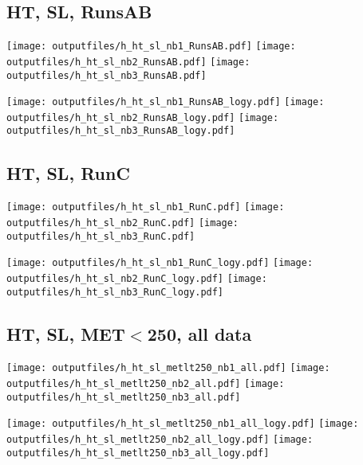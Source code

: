 \documentclass[11pt]{article}
\begin{document}
   \clearpage




    \subsection{ HT, SL, RunsAB}

    \noindent
     \texttt{[image: outputfiles/h\_ht\_sl\_nb1\_RunsAB.pdf]}
     \texttt{[image: outputfiles/h\_ht\_sl\_nb2\_RunsAB.pdf]}
     \texttt{[image: outputfiles/h\_ht\_sl\_nb3\_RunsAB.pdf]}

    \noindent
     \texttt{[image: outputfiles/h\_ht\_sl\_nb1\_RunsAB\_logy.pdf]}
     \texttt{[image: outputfiles/h\_ht\_sl\_nb2\_RunsAB\_logy.pdf]}
     \texttt{[image: outputfiles/h\_ht\_sl\_nb3\_RunsAB\_logy.pdf]}


    \subsection{ HT, SL, RunC}

    \noindent
     \texttt{[image: outputfiles/h\_ht\_sl\_nb1\_RunC.pdf]}
     \texttt{[image: outputfiles/h\_ht\_sl\_nb2\_RunC.pdf]}
     \texttt{[image: outputfiles/h\_ht\_sl\_nb3\_RunC.pdf]}

    \noindent
     \texttt{[image: outputfiles/h\_ht\_sl\_nb1\_RunC\_logy.pdf]}
     \texttt{[image: outputfiles/h\_ht\_sl\_nb2\_RunC\_logy.pdf]}
     \texttt{[image: outputfiles/h\_ht\_sl\_nb3\_RunC\_logy.pdf]}


    \subsection{ HT, SL, MET$<$250, all data}

    \noindent
     \texttt{[image: outputfiles/h\_ht\_sl\_metlt250\_nb1\_all.pdf]}
     \texttt{[image: outputfiles/h\_ht\_sl\_metlt250\_nb2\_all.pdf]}
     \texttt{[image: outputfiles/h\_ht\_sl\_metlt250\_nb3\_all.pdf]}

    \noindent
     \texttt{[image: outputfiles/h\_ht\_sl\_metlt250\_nb1\_all\_logy.pdf]}
     \texttt{[image: outputfiles/h\_ht\_sl\_metlt250\_nb2\_all\_logy.pdf]}
     \texttt{[image: outputfiles/h\_ht\_sl\_metlt250\_nb3\_all\_logy.pdf]}
\end{document}
